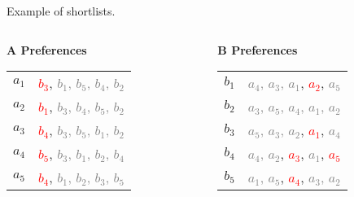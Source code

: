 \documentclass[aspectratio=169,xcolor=dvipsnames]{beamer}
\begin{document}
\begin{frame}{Example of shortlists.}
    \begin{columns}[t]
    \begin{column}{0.45\textwidth}
      \textbf{A Preferences}\\[6pt]
      \begin{tabular}{r@{: }l}
        $a_1$ & \textcolor{red}{$b_3$}, \textcolor{gray}{$b_1$, $b_5$, $b_4$, $b_2$} \\
        $a_2$ & \textcolor{red}{$b_1$}, \textcolor{gray}{$b_3$, $b_4$, $b_5$, $b_2$} \\
        $a_3$ & \textcolor{red}{$b_4$}, \textcolor{gray}{$b_3$, $b_5$, $b_1$, $b_2$} \\
        $a_4$ & \textcolor{red}{$b_5$}, \textcolor{gray}{$b_3$, $b_1$, $b_2$, $b_4$} \\
        $a_5$ & \textcolor{red}{$b_4$}, \textcolor{gray}{$b_1$, $b_2$, $b_3$, $b_5$} \\
      \end{tabular}
    \end{column}

    \begin{column}{0.45\textwidth}
      \textbf{B Preferences}\\[6pt]
      \begin{tabular}{r@{: }l}
        $b_1$ & \textcolor{gray}{$a_4$, $a_3$, $a_1$}, \textcolor{red}{$a_2$}, \textcolor{gray}{$a_5$} \\
        $b_2$ & \textcolor{gray}{$a_3$, $a_5$, $a_4$, $a_1$, $a_2$} \\
        $b_3$ & \textcolor{gray}{$a_5$, $a_3$, $a_2$}, \textcolor{red}{$a_1$}, \textcolor{gray}{$a_4$} \\
        $b_4$ & \textcolor{gray}{$a_4$, $a_2$}, \textcolor{red}{$a_3$}, \textcolor{gray}{$a_1$}, \textcolor{red}{$a_5$} \\
        $b_5$ & \textcolor{gray}{$a_1$, $a_5$}, \textcolor{red}{$a_4$}, \textcolor{gray}{$a_3$, $a_2$} \\
      \end{tabular}
    \end{column}
  \end{columns}
\end{frame}
\end{document}
